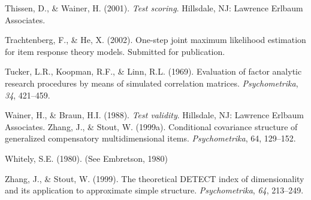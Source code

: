 \documentclass[titlepage,11pt,twoside]{article}
\begin{document}
\begin{thebibliography}
\bibitem Thissen, D., \& Wainer, H. (2001). \textit{Test scoring}. Hillsdale, NJ: Lawrence Erlbaum Associates.

\bibitem Trachtenberg, F., \& He, X. (2002). One-step joint maximum likelihood estimation for item response theory models. Submitted for publication.

\bibitem Tucker, L.R., Koopman, R.F., \& Linn, R.L. (1969). Evaluation of factor analytic research procedures by means of simulated correlation matrices. \textit{Psychometrika}, \textit{34}, 421--459.

\bibitem Wainer, H., \& Braun, H.I. (1988). \textit{Test validity}. Hillsdale, NJ: Lawrence Erlbaum Associates. Zhang, J., \& Stout, W. (1999a). Conditional covariance structure of generalized compensatory multidimensional items. \textit{Psychometrika}, 64, 129--152.

\bibitem Whitely, S.E. (1980). (See Embretson, 1980)

\bibitem Zhang, J., \& Stout, W. (1999). The theoretical DETECT index of dimensionality and its application to approximate simple structure. \textit{Psychometrika}, \textit{64}, 213--249.
\end{thebibliography}
\vspace{\fill}

\end{document}
